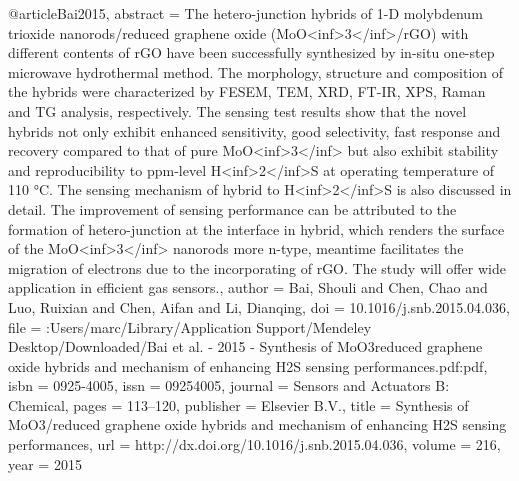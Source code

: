 @article{Bai2015,
abstract = {The hetero-junction hybrids of 1-D molybdenum trioxide nanorods/reduced graphene oxide (MoO{\textless}inf{\textgreater}3{\textless}/inf{\textgreater}/rGO) with different contents of rGO have been successfully synthesized by in-situ one-step microwave hydrothermal method. The morphology, structure and composition of the hybrids were characterized by FESEM, TEM, XRD, FT-IR, XPS, Raman and TG analysis, respectively. The sensing test results show that the novel hybrids not only exhibit enhanced sensitivity, good selectivity, fast response and recovery compared to that of pure MoO{\textless}inf{\textgreater}3{\textless}/inf{\textgreater} but also exhibit stability and reproducibility to ppm-level H{\textless}inf{\textgreater}2{\textless}/inf{\textgreater}S at operating temperature of 110 °C. The sensing mechanism of hybrid to H{\textless}inf{\textgreater}2{\textless}/inf{\textgreater}S is also discussed in detail. The improvement of sensing performance can be attributed to the formation of hetero-junction at the interface in hybrid, which renders the surface of the MoO{\textless}inf{\textgreater}3{\textless}/inf{\textgreater} nanorods more n-type, meantime facilitates the migration of electrons due to the incorporating of rGO. The study will offer wide application in efficient gas sensors.},
author = {Bai, Shouli and Chen, Chao and Luo, Ruixian and Chen, Aifan and Li, Dianqing},
doi = {10.1016/j.snb.2015.04.036},
file = {:Users/marc/Library/Application Support/Mendeley Desktop/Downloaded/Bai et al. - 2015 - Synthesis of MoO3reduced graphene oxide hybrids and mechanism of enhancing H2S sensing performances.pdf:pdf},
isbn = {0925-4005},
issn = {09254005},
journal = {Sensors and Actuators B: Chemical},
pages = {113--120},
publisher = {Elsevier B.V.},
title = {{Synthesis of MoO3/reduced graphene oxide hybrids and mechanism of enhancing H2S sensing performances}},
url = {http://dx.doi.org/10.1016/j.snb.2015.04.036},
volume = {216},
year = {2015}
}
